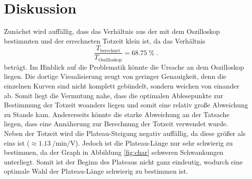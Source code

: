 \section{Diskussion}
\label{sec:Diskussion}
Zunächst wird auffällig, dass das Verhältnis aus der mit dem Oszilloskop bestimmten und der errechneten Totzeit klein ist, da
das Verhältnis
\begin{equation*}
    \frac{T_\text{berechnet}}{T_\text{Oszilloskop}} = \SI{68.75}{\percent} \; \text{.}
\end{equation*}
beträgt.
Im Hinblick auf die Problematik könnte die Ursache an dem Oszilloskop liegen. 
Die dortige Visualisierung zeugt von geringer Genauigkeit, denn die einzelnen Kurven sind nicht komplett gebündelt, sondern weichen von einander ab.
Somit liegt die Vermutung nahe, dass die optimalen Ablesepunkte zur Bestimmung der Totzeit woanders liegen und somit eine relativ große Abweichung zu Stande kam.
Andererseits könnte die starke Abweichung an der Tatsache liegen, dass eine Annäherung zur Berechnung der Totzeit verwendet wurde.\\
Neben der Totzeit wird die Plateau-Steigung negativ auffällig, da diese  größer als eins ist ($\approx \SI{1.13}{\per\minute\per\volt}$).
Jedoch ist die Plateau-Länge nur sehr schwierig zu bestimmen, da der Graph in Abbildung \ref{fig:char}
schweren Schwankungen unterliegt. 
Somit ist der Beginn des Plateaus nicht ganz eindeutig, wodurch eine optimale Wahl der Plateau-Länge schwierig zu bestimmen ist.